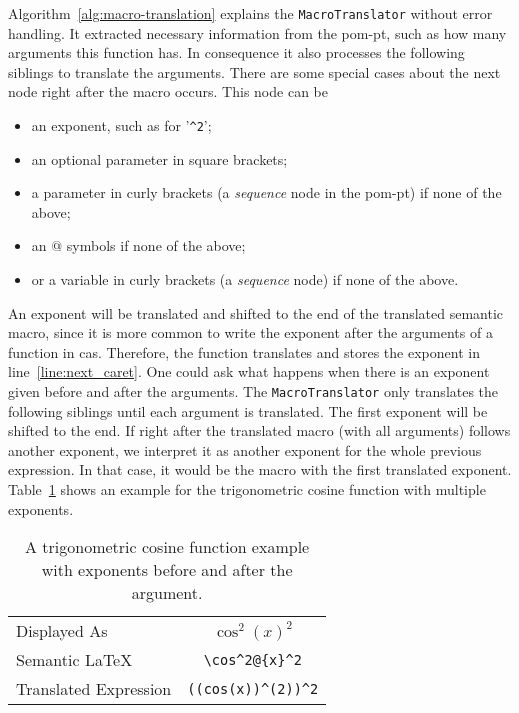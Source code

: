 Algorithm~\ref{alg:macro-translation} explains the \verb|MacroTranslator| without error handling. It extracted necessary information from the \gls*{pom-pt}, such as how many arguments this function has. In consequence it also processes the following siblings to translate the arguments. There are some special cases about the next node right after the macro occurs. This node can be
\begin{itemize}
\item an exponent, such as for '\verb|^2|';
\item an optional parameter in square brackets;
\item a parameter in curly brackets (a \textit{sequence} node in the \gls*{pom-pt}) if none of the above;
\item an $@$ symbols if none of the above;
\item or a variable in curly brackets (a \textit{sequence} node) if none of the above.
\end{itemize}

An exponent will be translated and shifted to the end of the translated semantic macro, since it is more common to write the exponent after the arguments of a function in \gls*{cas}. Therefore, the function translates and stores the exponent in line~\ref{line:next_caret}. One could ask what happens when there is an exponent given before and after the arguments. The \verb|MacroTranslator| only translates the following siblings until each argument is translated. The first exponent will be shifted to the end. If right after the translated macro (with all arguments) follows another exponent, we interpret it as another exponent for the whole previous expression. In that case, it would be the macro with the first translated exponent. Table~\ref{tab:multi-expo} shows an example for the trigonometric cosine function with multiple exponents. 
\begin{table}[ht]
\centering
\begin{tabular}{lc}
\hline
Displayed As & \rule{0pt}{0.9\normalbaselineskip} $\cos^2(x)^2$ \\
Semantic \LaTeX & \verb|\cos^2@{x}^2| \\
Translated \Maple{} Expression & \verb|((cos(x))^(2))^2|\\
\hline
\end{tabular}
\caption{A trigonometric cosine function example with exponents before and after the argument.}
\label{tab:multi-expo}
\end{table}

